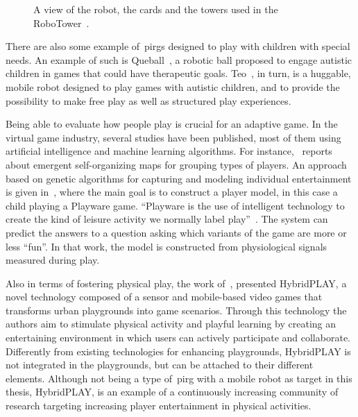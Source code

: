 \begin{figure}[htp]
  \centering  
  \caption{A view of the robot, the cards and the towers used in the RoboTower~\citep{bonarini_timing_2014}.}
    \label{fig:robo_tower}
\end{figure}

There are also some example of~\glspl{pirg} designed to play with children with special needs. An example of such is Queball~\citep{salter_designing_2014}, a robotic ball proposed to engage autistic children in games that could have therapeutic goals. Teo~\citep{bonarini_huggable_2016}, in turn, is a huggable, mobile robot designed to play games with autistic children, and to provide the possibility to make free play as well as structured play experiences.

Being able to evaluate how people play is crucial for an adaptive game. In the virtual game industry, several studies have been published, most of them using artificial intelligence and machine learning algorithms. For instance,~\cite{drachen_player_2009} reports about emergent self-organizing maps for grouping types of players. An approach based on genetic algorithms for capturing and modeling individual entertainment is given in~\cite{yannakakis_entertainment_2008}, where the main goal is to construct a player model, in this case a child playing a Playware game. ``Playware is the use of intelligent technology to create the kind of leisure activity we normally label play''~\citep{lund_playware_2005}. The system can predict the answers to a question asking which variants of the game are more or less ``fun''. In that work, the model is constructed from physiological signals measured during play.

Also in terms of fostering physical play, the work of~\cite{diaz_hybridplay:_2016}, presented HybridPLAY, a novel technology composed of a sensor and mobile-based video games that transforms urban playgrounds into game scenarios. Through this technology the authors aim to stimulate physical activity and playful learning by creating an entertaining environment in which users can actively participate and collaborate. Differently from existing technologies for enhancing playgrounds, HybridPLAY is not integrated in the playgrounds, but can be attached to their different elements. Although not being a type of~\gls{pirg} with a mobile robot as target in this thesis, HybridPLAY, is an example of a continuously increasing community of research targeting increasing player entertainment in physical activities.

